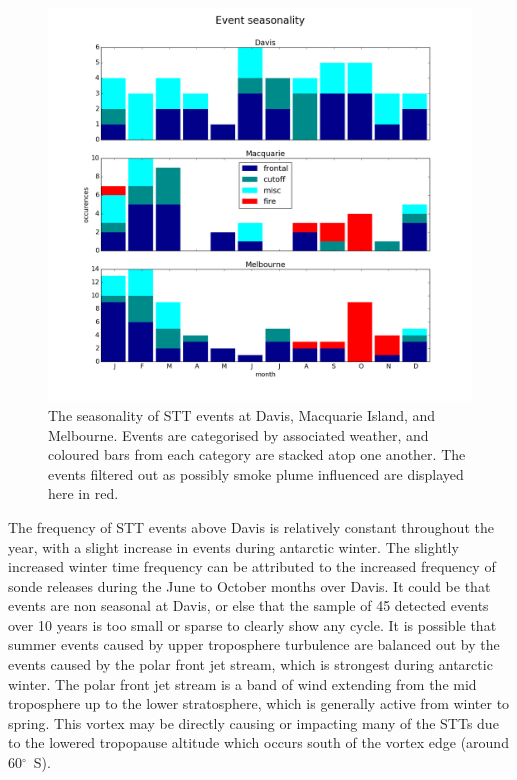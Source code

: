 \documentclass{article}
\begin{document}
  \begin{figure}[!htbp]
    \begin{center}
    \includegraphics[width=1.0\columnwidth]{figures/summary_season.png}
    \caption{The seasonality of STT events at Davis, Macquarie Island, and Melbourne.
    Events are categorised by associated weather, and coloured bars from each category are stacked atop one another.
    The events filtered out as possibly smoke plume influenced are displayed here in red.}
    \label{fig:SummarySeasonality}
    \end{center}
  \end{figure}
  
  The frequency of STT events above Davis is relatively constant throughout the year, with a slight increase in events during antarctic winter.
  The slightly increased winter time frequency can be attributed to the increased frequency of sonde releases during the June to October months over Davis.
  It could be that events are non seasonal at Davis, or else that the sample of 45 detected events over 10 years is too small or sparse to clearly show any cycle.
  It is possible that summer events caused by upper troposphere turbulence are balanced out by the events caused by the polar front jet stream, which is strongest during antarctic winter.
  The polar front jet stream is a band of wind extending from the mid troposphere up to the lower stratosphere, which is generally active from winter to spring. 
  This vortex may be directly causing or impacting many of the STTs due to the lowered tropopause altitude which occurs south of the vortex edge (around 60$^\circ$~S).
\end{document}
